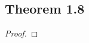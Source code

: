 \documentclass[../../main.tex]{subfiles}
\begin{document}
\subsection{Theorem 1.8}
\begin{wts}

\end{wts}
\begin{proof}

\end{proof}
\end{document}
